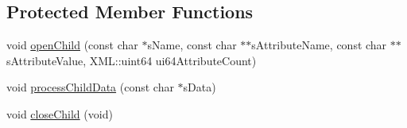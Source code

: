 \subsection*{Protected Member Functions}
\begin{DoxyCompactItemize}
\item 
void \hyperlink{classOpenViBEApplications_1_1P300StimulatorPropertyReader_afc6827ab2fa7eda4889c22de8de1bbda}{openChild} (const char $\ast$sName, const char $\ast$$\ast$sAttributeName, const char $\ast$$\ast$sAttributeValue, XML::uint64 ui64AttributeCount)
\item 
void \hyperlink{classOpenViBEApplications_1_1P300StimulatorPropertyReader_aa68c21ade60195b825050a1f13593af1}{processChildData} (const char $\ast$sData)
\item 
void \hyperlink{classOpenViBEApplications_1_1P300StimulatorPropertyReader_aa1cb7db4ca2e2f40b10b6441a80b8fc3}{closeChild} (void)
\end{DoxyCompactItemize}
